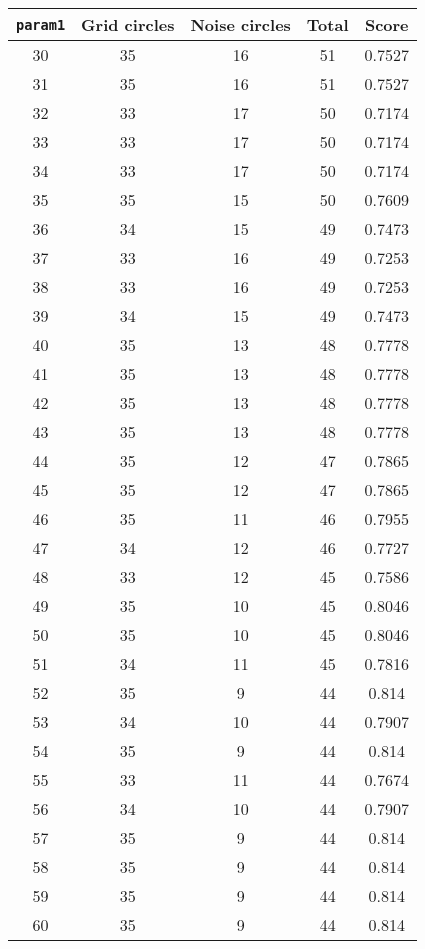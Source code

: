 \documentclass[letterpaper, 12pt]{article}
\begin{document}
\begin{longtable}{|c|c|c|c|c|}
\hline
\textbf{\texttt{param1}} & \textbf{Grid circles} & \textbf{Noise circles} & \textbf{Total} & \textbf{Score} \\
\hline
30 & 35 & 16 & 51 & 0.7527 \\
\hline
31 & 35 & 16 & 51 & 0.7527 \\
\hline
32 & 33 & 17 & 50 & 0.7174 \\
\hline
33 & 33 & 17 & 50 & 0.7174 \\
\hline
34 & 33 & 17 & 50 & 0.7174 \\
\hline
35 & 35 & 15 & 50 & 0.7609 \\
\hline
36 & 34 & 15 & 49 & 0.7473 \\
\hline
37 & 33 & 16 & 49 & 0.7253 \\
\hline
38 & 33 & 16 & 49 & 0.7253 \\
\hline
39 & 34 & 15 & 49 & 0.7473 \\
\hline
40 & 35 & 13 & 48 & 0.7778 \\
\hline
41 & 35 & 13 & 48 & 0.7778 \\
\hline
42 & 35 & 13 & 48 & 0.7778 \\
\hline
43 & 35 & 13 & 48 & 0.7778 \\
\hline
44 & 35 & 12 & 47 & 0.7865 \\
\hline
45 & 35 & 12 & 47 & 0.7865 \\
\hline
46 & 35 & 11 & 46 & 0.7955 \\
\hline
47 & 34 & 12 & 46 & 0.7727 \\
\hline
48 & 33 & 12 & 45 & 0.7586 \\
\hline
49 & 35 & 10 & 45 & 0.8046 \\
\hline
50 & 35 & 10 & 45 & 0.8046 \\
\hline
51 & 34 & 11 & 45 & 0.7816 \\
\hline
52 & 35 & 9 & 44 & 0.814 \\
\hline
53 & 34 & 10 & 44 & 0.7907 \\
\hline
54 & 35 & 9 & 44 & 0.814 \\
\hline
55 & 33 & 11 & 44 & 0.7674 \\
\hline
56 & 34 & 10 & 44 & 0.7907 \\
\hline
57 & 35 & 9 & 44 & 0.814 \\
\hline
58 & 35 & 9 & 44 & 0.814 \\
\hline
59 & 35 & 9 & 44 & 0.814 \\
\hline
60 & 35 & 9 & 44 & 0.814 \\

\end{longtable}
\end{document}
